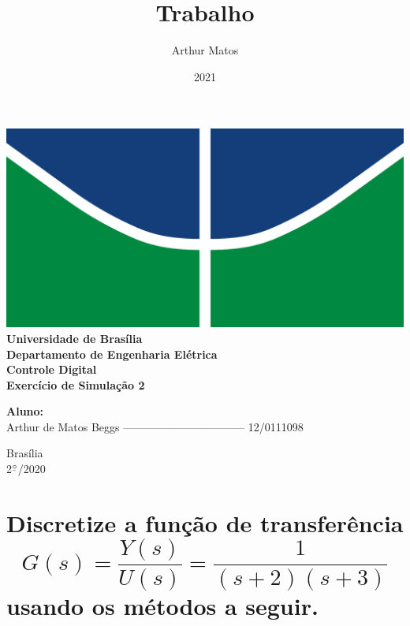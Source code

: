 \documentclass{article}
\title{Trabalho}
\author{Arthur Matos}
\date{2021}
\newcommand{\ubar}[1]{\underaccent{\bar}{#1}}
\begin{document}
\begin{titlepage}
    \begin{center}
        \centering
        \includegraphics[width=.7\linewidth]{images/logo_unb.png}\\[0.5cm]
        {\large \textbf{Universidade de Brasília}}\\[0.2cm]
        {\large \textbf{Departamento de Engenharia Elétrica}}\\[0.2cm]
        {\large \textbf{Controle Digital}}\\[4.8cm]
        {\bf \huge {Exercício de Simulação 2}}\\[0.2cm]
        {\bf \large {}}
    \end{center}

    \vspace{5cm}
    \hspace{2cm} {\noindent \bf \large {Aluno:}}\\
    \vspace{0.8cm}
    \hspace{2.35cm} {\large Arthur de Matos Beggs --------------------------------- 12/0111098}\\[1cm]

    \begin{center}
        {\large Brasília}\\
        {\large 2$^{\ubar{\circ}}$/2020}
    \end{center}

\end{titlepage}
\clearpage
\setcounter{page}{2}
\clearpage



\section*{Discretize a função de transferência $$ G(s) = \frac{Y(s)}{U(s)} = \frac{1}{(s+2)(s+3)} $$ usando os métodos a seguir.}
\end{document}

